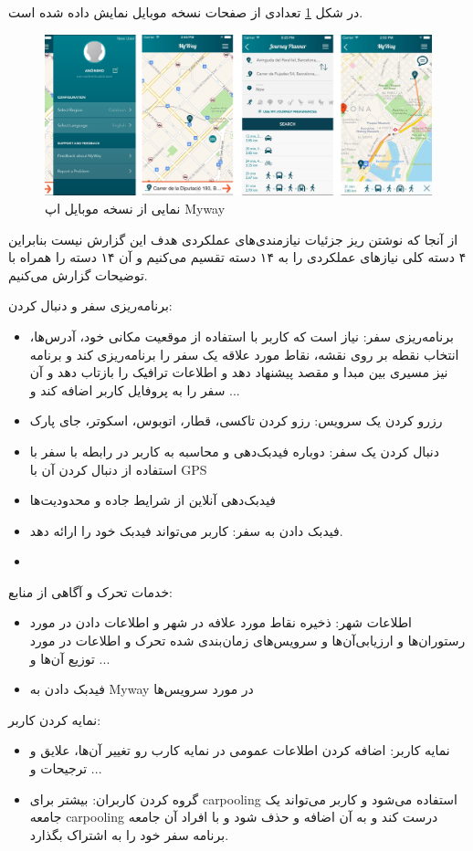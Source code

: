 در شکل \ref{fig: myway} تعدادی از صفحات نسخه موبایل نمایش داده شده است.
\begin{figure}[htb]
\centering
\includegraphics[scale=0.5]{myway.png}
\caption{نمایی از نسخه موبایل اپ Myway}
\label{fig: myway}
\end{figure}
از آنجا که نوشتن ریز جزئیات نیازمندی‌های عملکردی هدف این گزارش نیست بنابراین ۴ دسته کلی نیازهای عملکردی را به ۱۴ دسته تقسیم می‌کنیم و آن ۱۴ دسته را همراه با توضیحات گزارش می‌کنیم. 

برنامه‌ریزی سفر و دنبال کردن:
\begin{itemize}
\item
برنامه‌ریزی سفر: نیاز است که کاربر با استفاده از موقعیت مکانی خود، آدرس‌ها، انتخاب نقطه بر روی نقشه، نقاط مورد علاقه یک سفر را برنامه‌ریزی کند و برنامه نیز مسیری بین مبدا و مقصد پیشنهاد دهد و اطلاعات ترافیک را بازتاب دهد و  آن سفر را به پروفایل کاربر اضافه کند و ...
\item 
رزرو کردن یک سرویس: رزو کردن تاکسی، قطار، اتوبوس، اسکوتر، جای پارک 
\item
دنبال کردن یک سفر: دوباره فیدبک‌دهی و محاسبه به کاربر در رابطه با سفر با استفاده از دنبال کردن آن با GPS
\item
فیدبک‌دهی آنلاین از شرایط جاده و محدودیت‌ها
\item
فیدبک دادن به سفر: کاربر می‌تواند فیدبک خود را ارائه دهد.
\item

\end{itemize}

خدمات تحرک و آگاهی از منابع: 
\begin{itemize}
\item
اطلاعات شهر: ذخیره نقاط مورد علافه در شهر و اطلاعات دادن در مورد رستوران‌ها و ارزیابی‌آن‌ها و سرویس‌های زمان‌بندی شده تحرک و اطلاعات در مورد توزیع آن‌ها و ...
\item
فیدبک دادن به Myway در مورد سرویس‌ها
\end{itemize}

نمایه کردن کاربر: 
\begin{itemize}
\item
نمایه کاربر: اضافه کردن اطلاعات عمومی در نمایه کارب رو تغییر آن‌ها، علایق و ترجیحات و ...
\item 
گروه کردن کاربران: بیشتر برای carpooling استفاده می‌شود و کاربر می‌تواند یک جامعه carpooling درست کند و به آن اضافه و حذف شود و با افراد آن جامعه برنامه سفر خود را به اشتراک بگذارد.
\end{itemize}

